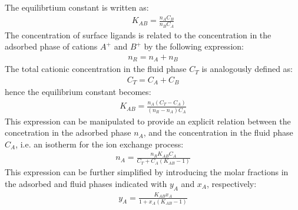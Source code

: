 \documentclass[letterpaper,10pt,english]{jupyterBook}
\begin{document}
\sphinxAtStartPar
The equilibrtium constant is written as:
\begin{equation}\label{equation:Ion_Exchange:IEXeq1}
\begin{split}
K_{AB}=\frac{n_AC_B}{n_BC_A}
\end{split}
\end{equation}
\sphinxAtStartPar
The concentration of surface ligands is related to the concentration in the adsorbed phase of cations \(A^+\) and \(B^+\) by the following expression:
\begin{equation}\label{equation:Ion_Exchange:IEXeq2}
\begin{split}
n_R=n_A+n_B
\end{split}
\end{equation}
\sphinxAtStartPar
The total cationic concentration in the fluid phase \(C_T\) is analogously defined as:
\begin{equation}\label{equation:Ion_Exchange:IEXeq3}
\begin{split}
C_T=C_A+C_B
\end{split}
\end{equation}
\sphinxAtStartPar
hence the equilibrium constant becomes:
\begin{equation}\label{equation:Ion_Exchange:IEXeq4}
\begin{split}
K_{AB}=\frac{n_A(C_T-C_A)}{(n_R-n_A)C_A}
\end{split}
\end{equation}
\sphinxAtStartPar
This expression can be manipulated to provide an explicit relation between the concetration in the adsorbed phase \(n_A\), and the concentration in the fluid phase \(C_A\), i.e. an isotherm for the ion exchange process:
\begin{equation}\label{equation:Ion_Exchange:IEXeq5}
\begin{split}
n_A=\frac{n_RK_{AB}C_A}{C_T+C_A(K_{AB}-1)}
\end{split}
\end{equation}
\sphinxAtStartPar
This expression can be further simplified by introducing the molar fractions in the adsorbed and fluid phases indicated with \(y_A\) and \(x_A\), respectively:
\begin{equation}\label{equation:Ion_Exchange:IEXeq6}
\begin{split}
y_A=\frac{K_{AB}x_A}{1+x_A(K_{AB}-1)}
\end{split}
\end{equation}
\end{document}
